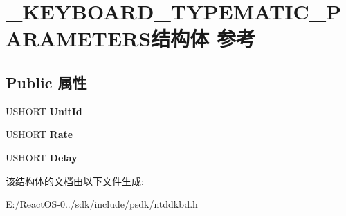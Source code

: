\hypertarget{struct___k_e_y_b_o_a_r_d___t_y_p_e_m_a_t_i_c___p_a_r_a_m_e_t_e_r_s}{}\section{\+\_\+\+K\+E\+Y\+B\+O\+A\+R\+D\+\_\+\+T\+Y\+P\+E\+M\+A\+T\+I\+C\+\_\+\+P\+A\+R\+A\+M\+E\+T\+E\+R\+S结构体 参考}
\label{struct___k_e_y_b_o_a_r_d___t_y_p_e_m_a_t_i_c___p_a_r_a_m_e_t_e_r_s}
\subsection*{Public 属性}
\begin{DoxyCompactItemize}
\item 
\mbox{\label{struct___k_e_y_b_o_a_r_d___t_y_p_e_m_a_t_i_c___p_a_r_a_m_e_t_e_r_s_a3f78a61d428134aa240b165b54bd32e7}} 
U\+S\+H\+O\+RT {\bfseries Unit\+Id}
\item 
\mbox{\label{struct___k_e_y_b_o_a_r_d___t_y_p_e_m_a_t_i_c___p_a_r_a_m_e_t_e_r_s_a3f8422fde68ef8d54c774cd5df511f08}} 
U\+S\+H\+O\+RT {\bfseries Rate}
\item 
\mbox{\label{struct___k_e_y_b_o_a_r_d___t_y_p_e_m_a_t_i_c___p_a_r_a_m_e_t_e_r_s_a4816d0cfa81061d698bc9ad45b2c528f}} 
U\+S\+H\+O\+RT {\bfseries Delay}
\end{DoxyCompactItemize}


该结构体的文档由以下文件生成\+:\begin{DoxyCompactItemize}
\item 
E\+:/\+React\+O\+S-\/0../sdk/include/psdk/ntddkbd.\+h\end{DoxyCompactItemize}
